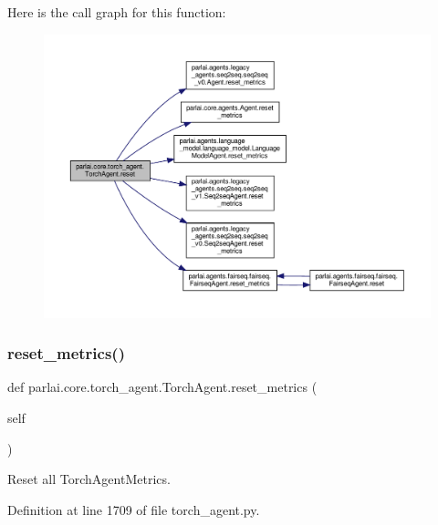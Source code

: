 Here is the call graph for this function\+:
\nopagebreak
\begin{figure}[H]
\begin{center}
\leavevmode
\includegraphics[width=350pt]{classparlai_1_1core_1_1torch__agent_1_1TorchAgent_a6f568650dd8e245a274671680ebb7587_cgraph}
\end{center}
\end{figure}
\mbox{\label{classparlai_1_1core_1_1torch__agent_1_1TorchAgent_a03e18955cfd44dd019d0847bc7a46893}} 
\subsubsection{\texorpdfstring{reset\+\_\+metrics()}{reset\_metrics()}}
{\footnotesize\ttfamily def parlai.\+core.\+torch\+\_\+agent.\+Torch\+Agent.\+reset\+\_\+metrics (\begin{DoxyParamCaption}\item[{}]{self }\end{DoxyParamCaption})}

\begin{DoxyVerb}Reset all TorchAgentMetrics.\end{DoxyVerb}
 

Definition at line 1709 of file torch\+\_\+agent.\+py.



